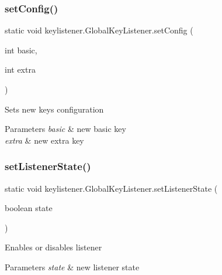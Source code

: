 \subsubsection{\texorpdfstring{set\+Config()}{setConfig()}}
{\footnotesize\ttfamily static void keylistener.\+Global\+Key\+Listener.\+set\+Config (\begin{DoxyParamCaption}\item[{int}]{basic,  }\item[{int}]{extra }\end{DoxyParamCaption})\hspace{0.3cm}{\ttfamily [static]}}

Sets new keys configuration 
\begin{DoxyParams}{Parameters}
{\em basic} & new basic key \\
\hline
{\em extra} & new extra key \\
\hline
\end{DoxyParams}
\mbox{\label{classkeylistener_1_1_global_key_listener_ac7791cb094144696ec7d2353918a4a3d}} 
\subsubsection{\texorpdfstring{set\+Listener\+State()}{setListenerState()}}
{\footnotesize\ttfamily static void keylistener.\+Global\+Key\+Listener.\+set\+Listener\+State (\begin{DoxyParamCaption}\item[{boolean}]{state }\end{DoxyParamCaption})\hspace{0.3cm}{\ttfamily [static]}}

Enables or disables listener 
\begin{DoxyParams}{Parameters}
{\em state} & new listener state \\
\hline
\end{DoxyParams}
\mbox{\label{classkeylistener_1_1_global_key_listener_ad66ec63997ce4dc870c9aedf34bb4b9a}} 
